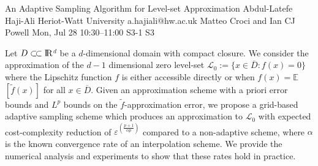 \begin{talk}
  {An Adaptive Sampling Algorithm for Level-set Approximation}%
  {Abdul-Latefe Haji-Ali}%
  {Heriot-Watt University}%
  {a.hajiali@hw.ac.uk}%
  {Matteo Croci and Ian CJ Powell}%
  {}%
  {Mon, Jul 28 10:30–11:00}%
  {S3-1}%
  {S3}%
  {}%
				

  Let $D\subset\joinrel\subset\rm{I\!R}$$^d$ be a $d$-dimensional domain with compact
closure. We consider the approximation of the $d-1$ dimensional zero level-set
$\mathcal{L}_0 := \{x \in \overline{D} : f(x) = 0\}$ where the Lipschitz function $f$ is either
accessible directly or when $f(x) = \mathbb{E}$$\left[\tilde{f}(x)\right]$ for
all $x \in \overline{D}$. Given an approximation scheme with a priori error bounds
and $L^p$ bounds on the $\tilde{f}$-approximation error, we propose a
grid-based adaptive sampling scheme which produces an approximation to $\mathcal{L}_0$
with expected cost-complexity reduction of $\varepsilon^{\left(\frac{p+1}{\alpha p}\right)}$
compared to a non-adaptive scheme, where $\alpha$ is the known convergence rate of
an interpolation scheme. We provide the numerical analysis and experiments to
show that these rates hold in practice.

\medskip


\end{talk}

